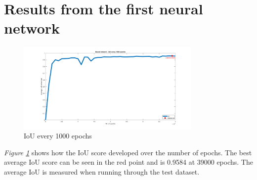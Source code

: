 \begin{table}[h]
\caption{Measured time when using the difference.py}
\label{tab:timediff}
\end{table}

\clearpage
\section{Results from the first neural network}
\begin{figure}[h]
    \centering
    \includegraphics[width=0.8\textwidth, trim={5cm 0 4cm 0},clip]{graphics/results/neuralnetworkauto.png}
    \caption{IoU every 1000 epochs}
    \label{fig:neuralnetwork}
\end{figure}
\textit{Figure \ref{fig:neuralnetwork}} shows how the IoU score developed over the number of epochs. The best average IoU score can be seen in the red point and is 0.9584 at 39000 epochs. The average IoU is measured when running through the test dataset.

